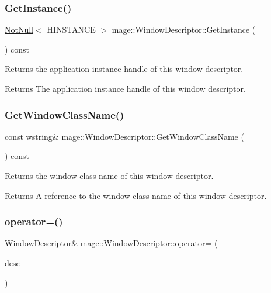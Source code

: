 \subsubsection{\texorpdfstring{Get\+Instance()}{GetInstance()}}
{\footnotesize\ttfamily \hyperlink{namespacemage_a8769f9d670d6b585ea306cb1062af94b}{Not\+Null}$<$ H\+I\+N\+S\+T\+A\+N\+CE $>$ mage\+::\+Window\+Descriptor\+::\+Get\+Instance (\begin{DoxyParamCaption}{ }\end{DoxyParamCaption}) const\hspace{0.3cm}{\ttfamily [noexcept]}}

Returns the application instance handle of this window descriptor.

\begin{DoxyReturn}{Returns}
The application instance handle of this window descriptor. 
\end{DoxyReturn}
\hypertarget{classmage_1_1_window_descriptor_a28e28c6aca97423689066d0f642e3561}{}\label{classmage_1_1_window_descriptor_a28e28c6aca97423689066d0f642e3561} 
\subsubsection{\texorpdfstring{Get\+Window\+Class\+Name()}{GetWindowClassName()}}
{\footnotesize\ttfamily const wstring\& mage\+::\+Window\+Descriptor\+::\+Get\+Window\+Class\+Name (\begin{DoxyParamCaption}{ }\end{DoxyParamCaption}) const\hspace{0.3cm}{\ttfamily [noexcept]}}

Returns the window class name of this window descriptor.

\begin{DoxyReturn}{Returns}
A reference to the window class name of this window descriptor. 
\end{DoxyReturn}
\hypertarget{classmage_1_1_window_descriptor_a539433423c905e8b45d5bc9d895ee79c}{}\label{classmage_1_1_window_descriptor_a539433423c905e8b45d5bc9d895ee79c} 
\subsubsection{\texorpdfstring{operator=()}{operator=()}\hspace{0.1cm}{\footnotesize\ttfamily [1/2]}}
{\footnotesize\ttfamily \hyperlink{classmage_1_1_window_descriptor}{Window\+Descriptor}\& mage\+::\+Window\+Descriptor\+::operator= (\begin{DoxyParamCaption}\item[{const \hyperlink{classmage_1_1_window_descriptor}{Window\+Descriptor} \&}]{desc }\end{DoxyParamCaption})\hspace{0.3cm}{\ttfamily [delete]}}

